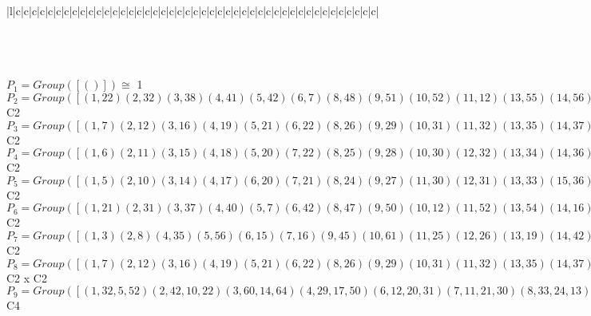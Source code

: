 \documentclass[varwidth=\maxdimen,border=10]{standalone}
\begin{document}
\begin{tabular}
\begin{array}{|l|c|c|c|c|c|c|c|c|c|c|c|c|c|c|c|c|c|c|c|c|c|c|c|c|c|c|c|c|c|c|c|c|c|c|c|c|c|c|c|c|c|c|c|c|c|}
\end{array}\)\\
\ \\
\ \\
$P_{1} = Group( [ () ] )\cong$ 1\ \\
$P_{2} = Group( [ ( 1,22)( 2,32)( 3,38)( 4,41)( 5,42)( 6, 7)( 8,48)( 9,51)(10,52)(11,12)(13,55)(14,56)(15,16)(17,57)(18,19)(20,21)(23,60)(24,61)(25,26)(27,62)(28,29)(30,31)(33,63)(34,35)(36,37)(39,40)(43,64)(44,45)(46,47)(49,50)(53,54)(58,59) ] )\cong$ C2\ \\
$P_{3} = Group( [ ( 1, 7)( 2,12)( 3,16)( 4,19)( 5,21)( 6,22)( 8,26)( 9,29)(10,31)(11,32)(13,35)(14,37)(15,38)(17,40)(18,41)(20,42)(23,45)(24,47)(25,48)(27,50)(28,51)(30,52)(33,54)(34,55)(36,56)(39,57)(43,59)(44,60)(46,61)(49,62)(53,63)(58,64) ] )\cong$ C2\ \\
$P_{4} = Group( [ ( 1, 6)( 2,11)( 3,15)( 4,18)( 5,20)( 7,22)( 8,25)( 9,28)(10,30)(12,32)(13,34)(14,36)(16,38)(17,39)(19,41)(21,42)(23,44)(24,46)(26,48)(27,49)(29,51)(31,52)(33,53)(35,55)(37,56)(40,57)(43,58)(45,60)(47,61)(50,62)(54,63)(59,64) ] )\cong$ C2\ \\
$P_{5} = Group( [ ( 1, 5)( 2,10)( 3,14)( 4,17)( 6,20)( 7,21)( 8,24)( 9,27)(11,30)(12,31)(13,33)(15,36)(16,37)(18,39)(19,40)(22,42)(23,43)(25,46)(26,47)(28,49)(29,50)(32,52)(34,53)(35,54)(38,56)(41,57)(44,58)(45,59)(48,61)(51,62)(55,63)(60,64) ] )\cong$ C2\ \\
$P_{6} = Group( [ ( 1,21)( 2,31)( 3,37)( 4,40)( 5, 7)( 6,42)( 8,47)( 9,50)(10,12)(11,52)(13,54)(14,16)(15,56)(17,19)(18,57)(20,22)(23,59)(24,26)(25,61)(27,29)(28,62)(30,32)(33,35)(34,63)(36,38)(39,41)(43,45)(44,64)(46,48)(49,51)(53,55)(58,60) ] )\cong$ C2\ \\
$P_{7} = Group( [ ( 1, 3)( 2, 8)( 4,35)( 5,56)( 6,15)( 7,16)( 9,45)(10,61)(11,25)(12,26)(13,19)(14,42)(17,53)(18,55)(20,37)(21,36)(22,38)(23,29)(24,52)(27,58)(28,60)(30,47)(31,46)(32,48)(33,39)(34,41)(40,63)(43,49)(44,51)(50,64)(54,57)(59,62) ] )\cong$ C2\ \\
$P_{8} = Group( [ ( 1, 7)( 2,12)( 3,16)( 4,19)( 5,21)( 6,22)( 8,26)( 9,29)(10,31)(11,32)(13,35)(14,37)(15,38)(17,40)(18,41)(20,42)(23,45)(24,47)(25,48)(27,50)(28,51)(30,52)(33,54)(34,55)(36,56)(39,57)(43,59)(44,60)(46,61)(49,62)(53,63)(58,64), ( 1,22)( 2,32)( 3,38)( 4,41)( 5,42)( 6, 7)( 8,48)( 9,51)(10,52)(11,12)(13,55)(14,56)(15,16)(17,57)(18,19)(20,21)(23,60)(24,61)(25,26)(27,62)(28,29)(30,31)(33,63)(34,35)(36,37)(39,40)(43,64)(44,45)(46,47)(49,50)(53,54)(58,59) ] )\cong$ C2 x C2\ \\
$P_{9} = Group( [ ( 1,32, 5,52)( 2,42,10,22)( 3,60,14,64)( 4,29,17,50)( 6,12,20,31)( 7,11,21,30)( 8,33,24,13)( 9,40,27,19)(15,45,36,59)(16,44,37,58)(18,51,39,62)(23,56,43,38)(25,53,46,34)(26,54,47,35)(28,57,49,41)(48,63,61,55), ( 1, 5)( 2,10)( 3,14)( 4,17)( 6,20)( 7,21)( 8,24)( 9,27)(11,30)(12,31)(13,33)(15,36)(16,37)(18,39)(19,40)(22,42)(23,43)(25,46)(26,47)(28,49)(29,50)(32,52)(34,53)(35,54)(38,56)(41,57)(44,58)(45,59)(48,61)(51,62)(55,63)(60,64) ] )\cong$ C4\ \\

\end{tabular}
\end{document}
